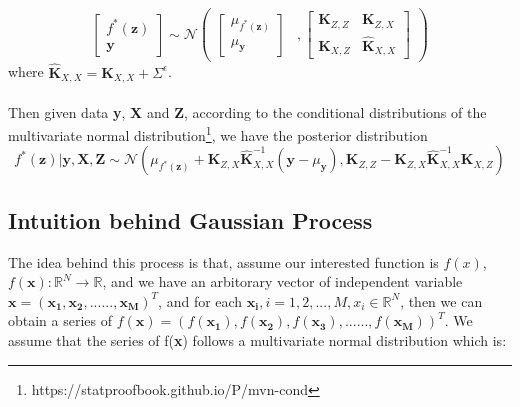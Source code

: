 \documentclass[UTF8]{article}
\begin{document}
\begin{equation}
\begin{bmatrix}
f^{*}(\boldsymbol{z}) \\
\boldsymbol{y} 
\end{bmatrix} \sim \mathcal{N}
\begin{pmatrix}
\begin{bmatrix}
\mu_{f^{*}(\boldsymbol{z})} \\ \mu_{\boldsymbol{y}}
\end{bmatrix} 
 & ,\begin{bmatrix}
\boldsymbol{K}_{Z, Z} & \boldsymbol{K}_{Z, X} \\
\boldsymbol{K}_{X, Z} & \hat{\boldsymbol{K}}_{X, X}
\end{bmatrix}
\end{pmatrix}
\end{equation}
where $ \hat{\boldsymbol{K}}_{X, X} = \boldsymbol{K}_{X, X} + \varSigma^{\epsilon}$. \\ \\
Then given data \textbf{y}, \textbf{X} and \textbf{Z}, according to the conditional distributions of the multivariate normal distribution\footnote{https://statproofbook.github.io/P/mvn-cond}, we have the posterior distribution 
\begin{equation}
 f^{*}(\boldsymbol{z}) | \boldsymbol{y}, \boldsymbol{X},  \boldsymbol{Z} \sim  \mathcal{N}(\mu_{f^{*}(\boldsymbol{z})} + \boldsymbol{K}_{Z, X}\hat{\boldsymbol{K}}_{X, X}^{-1}(\boldsymbol{y} - \mu_{\boldsymbol{y}}), \boldsymbol{K}_{Z, Z} - \boldsymbol{K}_{Z, X}\hat{\boldsymbol{K}}_{X, X}^{-1}\boldsymbol{K}_{X, Z})
\end{equation}

\subsection{Intuition behind Gaussian Process}
The idea behind this process is that, assume our interested function is $f(x)$, $ f(\boldsymbol{x}): \mathbb{R}^N \to \mathbb{R}$, and we have an arbitorary vector of independent variable $\boldsymbol{x} = (\boldsymbol{x_1}, \boldsymbol{x_2,} ......, \boldsymbol{x_M})^T$, and for each $\boldsymbol{x_i}, i = 1, 2, ...,M, x_i \in \mathbb{R}^N$, then we can obtain a series of $f(\boldsymbol{x})= (f(\boldsymbol{x_1}), f(\boldsymbol{x_2}), f(\boldsymbol{x_3}), ......, f(\boldsymbol{x_M}) )^T$. We assume that the series of f(\textbf{x}) follows a multivariate normal distribution which is: 
\end{document}

